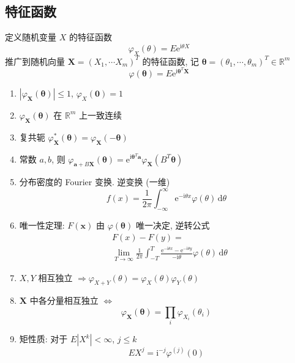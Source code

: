 \documentclass[11pt,a4paper,twocolumn]{article} %
\numberwithin{equation}{section} %
\renewcommand*{\vec}[1]{\bm{#1}} %
\newcommand{\dif}{\,\mathrm d}
\newcommand\mi{\mathrm{i}}
\newcommand\e{\mathrm{e}} %
\begin{document}
\subsection{特征函数} %
\label{sub:chara_func}
定义随机变量 $X$ 的特征函数
\begin{equation}
	\varphi_X(\theta) = E\e^{\mi\theta X}
\end{equation}
推广到随机向量 $\vec X = (X_1, \cdots X_m)^T$ 的特征函数, 
记 $\vec \theta = (\theta_1, \cdots, \theta_m)^T\in\mathbb R^m$
\begin{equation}
	\varphi(\vec\theta) = E\e^{\mi\vec\theta^T\vec X}
\end{equation}
\begin{enumerate}
	\item $|\varphi_{\vec X}(\vec \theta)|\le 1$, $\varphi_X(\vec 0) = 1$
	\item $\varphi_{\vec X}(\vec \theta)$ 在 $\mathbb R^m$ 上一致连续
	\item 复共轭 $\varphi_{\vec X}^*(\vec \theta) =
	\varphi_{\vec X}(-\vec \theta)$
	\item 常数 $a, b$, 则 
	$\varphi_{\vec a+B\vec X}(\vec \theta) = \e^{\mi\vec \theta^T \vec a}
	\varphi_{\vec X}(B^T\vec\theta)$
	\item 分布密度的 Fourier 变换. 逆变换 (一维)
	\begin{equation}
		f(x) = \frac{1}{2\pi}\int_{-\infty}^\infty 
		\e^{-\mi\theta x}\varphi(\theta)\dif\theta
	\end{equation}
	\item 唯一性定理: $F(\vec x)$ 由 $\varphi(\vec \theta)$ 唯一决定, 逆转公式
	\begin{equation}
	\begin{split}
		&F(x) - F(y) = \\
		&\lim_{T\to\infty}\frac{1}{2\pi}\int_{-T}^T
		\frac{\e^{-\mi\theta x} - \e^{-\mi\theta y}}{-\mi\theta}
		\varphi(\theta)\dif\theta
	\end{split}
	\end{equation}
	\item $X, Y$ 相互独立 $\Rightarrow \varphi_{X+Y}(\theta)
	 = \varphi_X(\theta)\varphi_Y(\theta)$
	\item $\vec X$ 中各分量相互独立 $\Leftrightarrow$
	$$
		\varphi_{\vec X}(\vec \theta) = \prod_i \varphi_{X_i}(\theta_i)
	$$
	\item 矩性质: 对于 $E|X^k| < \infty$, $j\le k$
	\begin{equation}
		EX^j = \mi^{-j}\varphi^{(j)}(0)
	\end{equation}

\end{enumerate}
\end{document}
